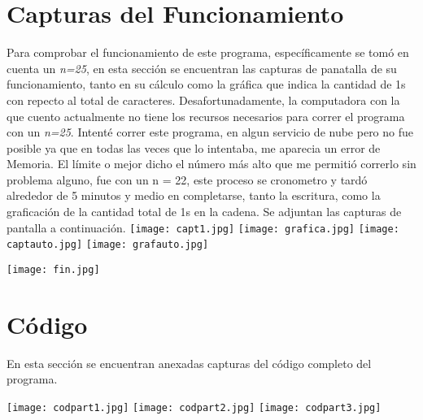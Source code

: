 \documentclass{article}
\begin{document}
	\section*{Capturas del Funcionamiento}
	Para comprobar el funcionamiento de este programa, específicamente se tomó en cuenta un {\it n=25}, en esta sección se encuentran las capturas de panatalla de su funcionamiento, tanto en su cálculo como la gráfica que indica la cantidad de 1s con repecto al total de caracteres.
	Desafortunadamente, la computadora con la que cuento actualmente no tiene los recursos necesarios para correr el programa con un {\it n=25}. Intenté correr este programa, en algun servicio de nube pero no fue posible ya que en todas las veces que lo intentaba, me aparecia un error de Memoria. El límite o mejor dicho el número más alto que me permitió correrlo sin problema alguno, fue con un n = 22, este proceso se cronometro y tardó alrededor de 5 minutos y medio en completarse, tanto la escritura, como la graficación de la cantidad total de 1s en la cadena. Se adjuntan las capturas de pantalla a continuación.
	\vspace{2.5cm}	
		\centering
		\texttt{[image: capt1.jpg]}
		\texttt{[image: grafica.jpg]}
	\vspace{1cm}	
		\texttt{[image: captauto.jpg]}
		\texttt{[image: grafauto.jpg]}
	
		\texttt{[image: fin.jpg]}
		
	
	
	\section*{Código}
	En esta sección se encuentran anexadas capturas del código completo del programa.
			
		\texttt{[image: codpart1.jpg]}	
		\texttt{[image: codpart2.jpg]}				
		\texttt{[image: codpart3.jpg]}
	
	
\end{document}
